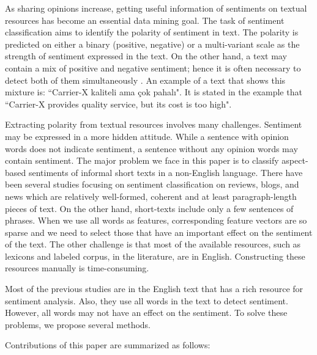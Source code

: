 \documentclass[12pt]{article}
\begin{document}
 As sharing opinions increase, getting useful information of sentiments on textual resources has become an essential data mining goal. The task of sentiment
classification aims to identify the polarity of sentiment in text. The
polarity is predicted on either a binary (positive, negative) or a
multi-variant scale as the strength of sentiment expressed in the
text. On the other hand, a text may contain a mix of
 positive and negative sentiment; hence it is often necessary to detect both of them simultaneously \cite{2}. An example of a text that shows this mixture is: ``Carrier-X kaliteli ama \c{c}ok pahal{\i}". It is stated in the example that ``Carrier-X provides quality service, but its cost is too high".

Extracting polarity from textual resources involves many challenges.
Sentiment may be expressed in a more hidden attitude. While a sentence with opinion words does not indicate sentiment, a sentence without any opinion words may contain
sentiment. 
The major problem we face in this paper is to classify aspect-based sentiments of informal short texts in a non-English language.
There have been several studies focusing on sentiment classification on reviews, blogs, and news which are relatively well-formed, coherent
and at least paragraph-length pieces of text. On the other hand,
short-texts include only a few sentences of phrases. When we use all words as
features, corresponding feature vectors are so sparse and we need to select
those that have an important effect on the sentiment of the text. The
other challenge is that most of the available resources, such as lexicons and labeled corpus, in the literature, are in English.
Constructing these resources manually is time-consuming.



Most of the previous studies are in the English text that has a rich resource for sentiment analysis. Also, they use all words in the text to detect sentiment. However, all words may not have an effect on the sentiment. To solve these problems, we propose several methods.

Contributions of this paper are summarized as follows:
\end{document}
